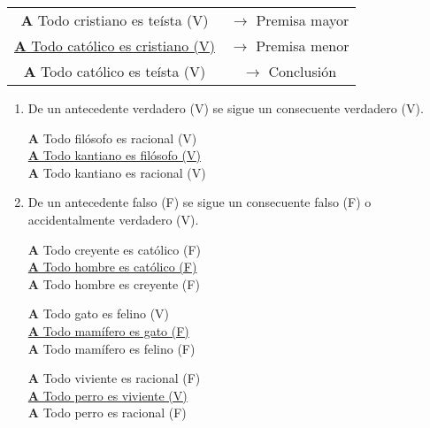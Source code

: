 \documentclass{article}
\begin{document}
\begin{center}
\begin{tabular}{c c}
     \textbf{A} Todo cristiano es teísta (V) & $\rightarrow$ Premisa mayor \\
     \underline{\textbf{A} Todo católico es cristiano (V)} & $\rightarrow$ Premisa menor \\
     \textbf{A} Todo católico es teísta (V) & $\rightarrow$ Conclusión    \\ 
\end{tabular}
\begin{enumerate}

\subsubsection{Leyes de la argumentación}
    \item De un antecedente verdadero (V) se sigue un consecuente verdadero (V).
    
    \begin{center}
        \textbf{A} Todo filósofo es racional (V) \\
        \underline{\textbf{A} Todo kantiano es filósofo (V)}  \\
        \textbf{A} Todo kantiano es racional (V) \\
    \end{center}
    
    \item De un antecedente falso (F) se sigue un consecuente falso (F) o accidentalmente verdadero (V).

    \begin{center}
        \textbf{A} Todo creyente es católico (F) \\
        \underline{\textbf{A} Todo hombre es católico (F)} \\
        \textbf{A} Todo hombre es creyente (F)
    \end{center}
    
    \begin{center}
        \textbf{A} Todo gato es felino (V) \\
        \underline{\textbf{A} Todo mamífero es gato (F)} \\
        \textbf{A} Todo mamífero es felino (F) \\
    \end{center}
    
    \begin{center}
        \textbf{A} Todo viviente es racional (F) \\
        \underline{\textbf{A} Todo perro es viviente (V)} \\
        \textbf{A} Todo perro es racional (F) \\
    \end{center}
      

\end{enumerate}
\end{center}
\end{document}
